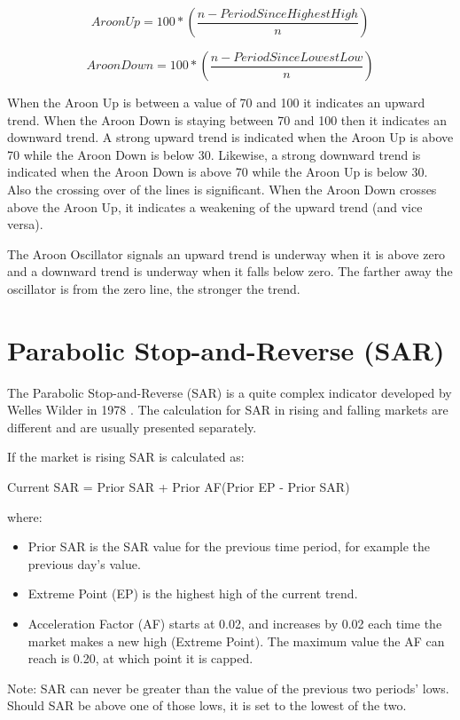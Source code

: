 \[ Aroon Up = 100 * \left( \dfrac{n - PeriodSinceHighestHigh}{n} \right) \]

\[ Aroon Down = 100 * \left( \dfrac{n - PeriodSinceLowestLow}{n} \right) \]

When the Aroon Up is between a value of 70 and 100 it indicates an upward trend. When the Aroon Down is staying between 70 and 100 then it indicates an downward trend. A strong upward trend is indicated when the Aroon Up is above 70 while the Aroon Down is below 30. Likewise, a strong downward trend is indicated when the Aroon Down is above 70 while the Aroon Up is below 30. Also the crossing over of the lines is significant. When the Aroon Down crosses above the Aroon Up, it indicates a weakening of the upward trend (and vice versa).


The Aroon Oscillator signals an upward trend is underway when it is above zero and a downward trend is underway when it falls below zero. The farther away the oscillator is from the zero line, the stronger the trend.

\section{Parabolic Stop-and-Reverse (SAR)}
\label{appB:sar}
The Parabolic Stop-and-Reverse (SAR) is a quite complex indicator developed by Welles Wilder in 1978 \citep{wilder1978new}. The calculation for SAR in rising and falling markets are different and are usually presented separately.

If the market is rising SAR is calculated as:
\begin{center}
Current SAR = Prior SAR + Prior AF(Prior EP - Prior SAR)
\end{center}

where:\\
\begin{itemize}
\item Prior SAR is the SAR value for the previous time period, for example the previous day's value.
\item Extreme Point (EP) is the highest high of the current trend.
\item Acceleration Factor (AF) starts at 0.02, and increases by 0.02 each time the market makes a new high (Extreme Point). The maximum value the AF can reach is 0.20, at which point it is capped.
\end{itemize}
Note:  SAR can never be greater than the value of the previous two periods' lows. Should SAR be above one of those lows, it is set to the lowest of the two.

